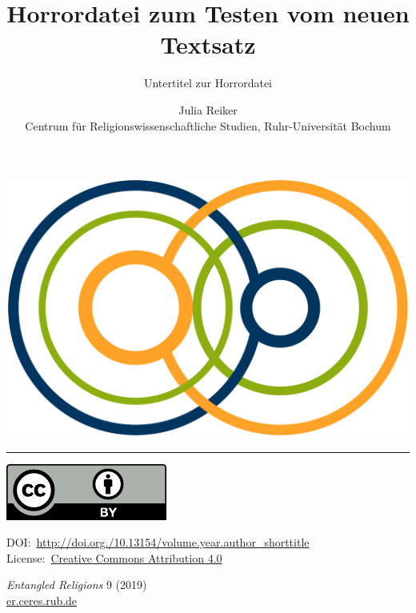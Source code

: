 \documentclass[
  english,
  a4paper,
  DIV=12,
  footlines=2.1,
  usegeometry=true]{scrartcl}
\title{Horrordatei zum Testen vom neuen Textsatz}
\subtitle{Untertitel zur Horrordatei}
\author{Julia Reiker\\Centrum für Religionswissenschaftliche Studien,
Ruhr-Universität Bochum}
\date{}
\begin{document}
\frenchspacing

\cleardoubleoddpage
\thispagestyle{empty}
\begin{singlespace}

\hfill\includegraphics[height=3\baselineskip]{Logo_ER.pdf}
\noindent\rule{\textwidth}{\heavyrulewidth}

\vspace*{.2\baselineskip}
\noindent\begin{minipage}[c]{.13\textwidth}
\scriptsize
\parbox{.2\textwidth}{\includegraphics[height=2\baselineskip,width=\csname Gin@nat@width\endcsname,keepaspectratio]{cc-by.pdf}}
\end{minipage}
\begin{minipage}[c]{.4\textwidth}
\scriptsize
\raggedright
DOI:~\href{https://doi.org/http://doi.org./10.13154/volume.year.author\_shorttitle}{http://doi.org./10.13154/volume.year.author\_shorttitle}\\
License:~\href{http://creativecommons.org/licenses/by/4.0/}{Creative
Commons Attribution 4.0}
\end{minipage}\hfill
\begin{minipage}[c]{.4\textwidth}
\scriptsize
\raggedleft
\textit{Entangled Religions} 9 (2019)\\
\href{https://er.ceres.rub.de/}{er.ceres.rub.de}
\end{minipage}


\end{singlespace}
\end{document}
